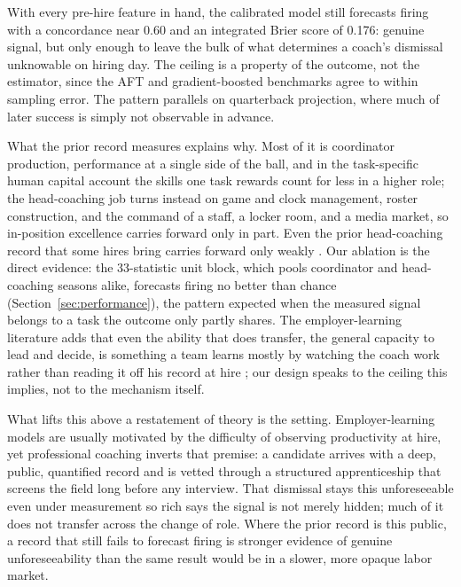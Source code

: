 \documentclass[12pt,USenglish]{article}
\begin{document}
With every pre-hire feature in hand, the calibrated model still forecasts firing with a concordance near 0.60 and an integrated Brier score of 0.176: genuine signal, but only enough to leave the bulk of what determines a coach's dismissal unknowable on hiring day. The ceiling is a property of the outcome, not the estimator, since the AFT and gradient-boosted benchmarks agree to within sampling error. The pattern parallels \citet{wolfson2011} on quarterback projection, where much of later success is simply not observable in advance.

What the prior record measures explains why. Most of it is coordinator production, performance at a single side of the ball, and in the task-specific human capital account \citep{gibbonswaldman2004} the skills one task rewards count for less in a higher role; the head-coaching job turns instead on game and clock management, roster construction, and the command of a staff, a locker room, and a media market, so in-position excellence carries forward only in part. Even the prior head-coaching record that some hires bring carries forward only weakly \citep{roach2016}. Our ablation is the direct evidence: the 33-statistic unit block, which pools coordinator and head-coaching seasons alike, forecasts firing no better than chance (Section~\ref{sec:performance}), the pattern expected when the measured signal belongs to a task the outcome only partly shares. The employer-learning literature adds that even the ability that does transfer, the general capacity to lead and decide, is something a team learns mostly by watching the coach work rather than reading it off his record at hire \citep{farbergibbons1996, altonjipierret2001}; our design speaks to the ceiling this implies, not to the mechanism itself.

What lifts this above a restatement of theory is the setting. Employer-learning models are usually motivated by the difficulty of observing productivity at hire, yet professional coaching inverts that premise: a candidate arrives with a deep, public, quantified record and is vetted through a structured apprenticeship that screens the field long before any interview. That dismissal stays this unforeseeable even under measurement so rich says the signal is not merely hidden; much of it does not transfer across the change of role. Where the prior record is this public, a record that still fails to forecast firing is stronger evidence of genuine unforeseeability than the same result would be in a slower, more opaque labor market.
\end{document}
